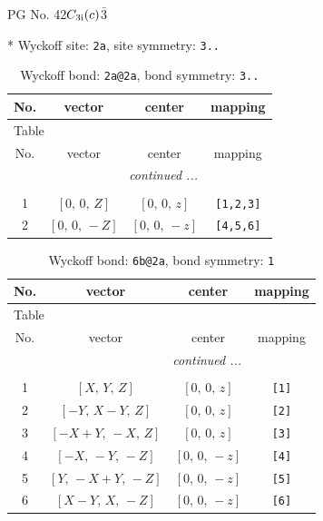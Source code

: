 \documentclass[fleqn,8pt]{jsarticle}
\begin{document}
\setcounter{MaxMatrixCols}{32}

\renewcommand{\tablename}{Table~}
\renewcommand{\figurename}{Figure~}
\begin{center}
\LARGE
PG No. 42\quad$C_{\rm 3i}(c)$\quad$\bar{3}$\quad[ trigonal ]
\end{center}


* Wyckoff site: {\tt 2a}, site symmetry: {\tt 3..}
\renewcommand{\arraystretch}{1.2}
\begin{longtable}{cccc}
\caption{Wyckoff bond: {\tt 2a@2a}, bond symmetry: {\tt 3..}}
 \\
 \hline \hline
No. & vector & center & mapping \\ \hline \endfirsthead

\multicolumn{3}{l}{\tablename\ \thetable{}} \\
 \hline \hline
No. & vector & center & mapping \\ \hline \endhead

 \hline \hline
\multicolumn{3}{r}{\footnotesize\it continued ...} \\ \endfoot

 \hline \hline
\multicolumn{3}{r}{} \\ \endlastfoot

1 & $\left[ 0,\, 0,\, Z \right]$ & $\left[ 0,\, 0,\, z \right]$ & {\tt [1,2,3]} \\ \hline
2 & $\left[ 0,\, 0,\, - Z \right]$ & $\left[ 0,\, 0,\, - z \right]$ & {\tt [4,5,6]} \\
\end{longtable}
\renewcommand{\arraystretch}{1.2}
\begin{longtable}{cccc}
\caption{Wyckoff bond: {\tt 6b@2a}, bond symmetry: {\tt 1}}
 \\
 \hline \hline
No. & vector & center & mapping \\ \hline \endfirsthead

\multicolumn{3}{l}{\tablename\ \thetable{}} \\
 \hline \hline
No. & vector & center & mapping \\ \hline \endhead

 \hline \hline
\multicolumn{3}{r}{\footnotesize\it continued ...} \\ \endfoot

 \hline \hline
\multicolumn{3}{r}{} \\ \endlastfoot

1 & $\left[ X,\, Y,\, Z \right]$ & $\left[ 0,\, 0,\, z \right]$ & {\tt [1]} \\ \hline
2 & $\left[ - Y,\, X - Y,\, Z \right]$ & $\left[ 0,\, 0,\, z \right]$ & {\tt [2]} \\ \hline
3 & $\left[ - X + Y,\, - X,\, Z \right]$ & $\left[ 0,\, 0,\, z \right]$ & {\tt [3]} \\ \hline
4 & $\left[ - X,\, - Y,\, - Z \right]$ & $\left[ 0,\, 0,\, - z \right]$ & {\tt [4]} \\ \hline
5 & $\left[ Y,\, - X + Y,\, - Z \right]$ & $\left[ 0,\, 0,\, - z \right]$ & {\tt [5]} \\ \hline
6 & $\left[ X - Y,\, X,\, - Z \right]$ & $\left[ 0,\, 0,\, - z \right]$ & {\tt [6]} \\
\end{longtable}
\end{document}
